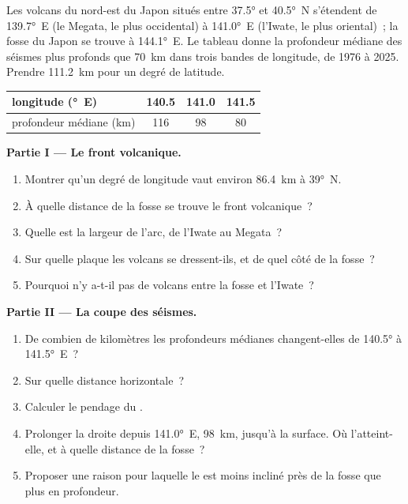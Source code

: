 \begin{problem}
\label{pb:g12:subduction-magmatism:1}
Les volcans du nord-est du Japon situés entre \ang{37.5} et \ang{40.5}~N
s'étendent de \ang{139.7}~E (le Megata, le plus occidental) à
\ang{141.0}~E (l'Iwate, le plus oriental)~; la fosse du Japon se trouve à
\ang{144.1}~E. Le tableau donne la profondeur médiane des séismes plus
profonds que \qty{70}{km} dans trois bandes de longitude, de 1976 à 2025.
Prendre \qty{111.2}{km} pour un degré de latitude.

\begin{center}
\small
\begin{tabular}{|l|c|c|c|}
\hline
longitude (\unit{\degree}~E) & 140.5 & 141.0 & 141.5 \\ \hline
profondeur médiane (\unit{km}) & 116 & 98 & 80 \\ \hline
\end{tabular}
\end{center}

\medskip
\noindent\textbf{Partie I --- Le front volcanique.}
\begin{enumerate}
  \item Montrer qu'un degré de longitude vaut environ \qty{86.4}{km} à
        \ang{39}~N.
  \item À quelle distance de la fosse se trouve le front volcanique~?
  \item Quelle est la largeur de l'arc, de l'Iwate au Megata~?
  \item Sur quelle plaque les volcans se dressent-ils, et de quel côté de
        la fosse~?
  \item Pourquoi n'y a-t-il pas de volcans entre la fosse et l'Iwate~?
\end{enumerate}

\medskip
\noindent\textbf{Partie II --- La coupe des séismes.}
\begin{enumerate}[resume]
  \item De combien de kilomètres les profondeurs médianes changent-elles de
        \ang{140.5} à \ang{141.5}~E~?
  \item Sur quelle distance horizontale~?
  \item Calculer le pendage du .
  \item Prolonger la droite depuis \ang{141.0}~E, \qty{98}{km}, jusqu'à la
        surface. Où l'atteint-elle, et à quelle distance de la fosse~?
  \item Proposer une raison pour laquelle le  est moins incliné près
        de la fosse que plus en profondeur.
\end{enumerate}


\end{problem}
